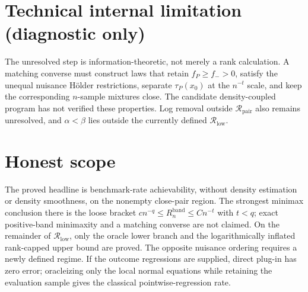 \documentclass{article}
\begin{document}
\section*{Technical internal limitation (diagnostic only)}

The unresolved step is information-theoretic, not merely a rank calculation.  A matching converse must construct laws that retain \(f_P\geq f_->0\), satisfy the unequal nuisance H\"older restrictions, separate \(\tau_P(x_0)\) at the \(n^{-t}\) scale, and keep the corresponding \(n\)-sample mixtures close.  The candidate density-coupled program has not verified these properties.  Log removal outside \(\mathcal R_{\mathrm{pair}}\) also remains unresolved, and \(\alpha<\beta\) lies outside the currently defined \(\mathcal R_{\mathrm{low}}\).

\section{Honest scope}

The proved headline is benchmark-rate achievability, without density estimation or density smoothness, on the nonempty close-pair region.  The strongest minimax conclusion there is the loose bracket \(c n^{-q}\leq R_n^{\mathrm{band}}\leq Cn^{-t}\) with \(t<q\); exact positive-band minimaxity and a matching converse are not claimed.  On the remainder of \(\mathcal R_{\mathrm{low}}\), only the oracle lower branch and the logarithmically inflated rank-capped upper bound are proved.  The opposite nuisance ordering requires a newly defined regime.  If the outcome regressions are supplied, direct plug-in has zero error; oracleizing only the local normal equations while retaining the evaluation sample gives the classical pointwise-regression rate.
\end{document}
